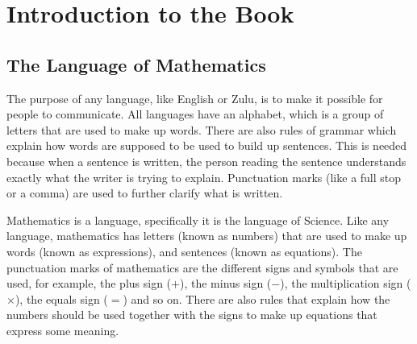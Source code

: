  \chapter{Introduction to the Book}
\label{mathintro}

\section{The Language of Mathematics}
The purpose of any language, like English or Zulu, is to make it possible for people to communicate. All languages have an alphabet, which is a group of letters that are used to make up words. There are also rules of grammar which explain how words are supposed to be used to build up sentences. This is needed because when a sentence is written, the person reading the sentence understands exactly what the writer is trying to explain. Punctuation marks (like a full stop or a comma) are used to further clarify what is written.

Mathematics is a language, specifically it is the language of Science. Like any language, mathematics has letters (known as numbers) that are used to make up words (known as expressions), and sentences (known as equations). The punctuation marks of mathematics are the different signs and symbols that are used, for example, the plus sign ($+$), the minus sign ($-$), the multiplication sign ($\times$), the equals sign ($=$) and so on. There are also rules that explain how the numbers should be used together with the signs to make up equations that express some meaning.




